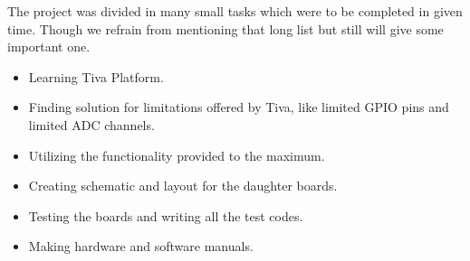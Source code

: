 \documentclass[a4paper,12pt,oneside]{book}
\begin{document}
The project was divided in many small tasks which were to be completed in given time. Though we refrain from mentioning that long list but still will give some important one.
\begin{itemize}
	\item Learning Tiva Platform.
	\item Finding solution for limitations offered by Tiva, like limited GPIO pins and limited ADC channels.
	\item Utilizing the functionality provided to the maximum.
	\item Creating schematic and layout for the daughter boards.
	\item Testing the boards and writing all the test codes.
	\item Making hardware and software manuals.
\end{itemize}
\end{document}

